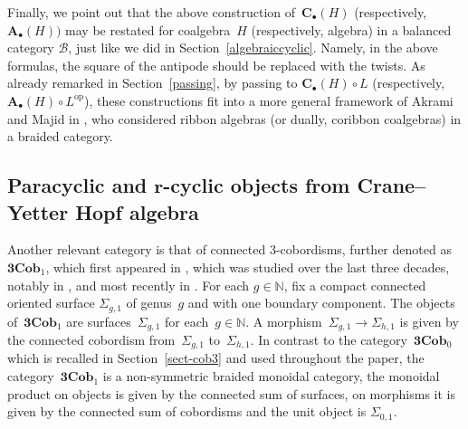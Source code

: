 \documentclass[10pt,a4paper]{amsart}
\numberwithin{equation}{section}
\newcommand{\mc}{\mathcal}
\newcommand{\opp}{\mathrm{op}}
\newcommand{\N}{\mathbb{N}}
\newcommand{\Cob}{\textbf{Cob}}
\newcommand{\conncob}{\textbf{3Cob}_1}
\begin{document}
Finally, we point out that the above construction of~$\textbf{C}_\bullet(H)$ (respectively,~$\textbf{A}_\bullet(H))$ may be restated for coalgebra~$H$ (respectively, algebra) in a balanced category $\mc B$, just like we did in Section~\ref{algebraiccyclic}. Namely, in the above formulas, the square of the antipode should be replaced with the twists. As already remarked in Section~\ref{passing}, by passing to $\textbf{C}_\bullet(H)\circ L$ (respectively,~$\textbf{A}_\bullet(H)\circ L^\opp$), these constructions fit into a more general framework of Akrami and Majid in \cite{cycliccocycles}, who considered ribbon algebras (or dually, coribbon coalgebras) in a braided category.



\subsection[Paracyclic and r-cyclic objects from Crane--Yetter Hopf algebra]{Paracyclic and $\boldsymbol{r}$-cyclic objects from Crane--Yetter Hopf algebra} \label{cy para}
Another relevant category is that of connected $3$-cobordisms, further denoted as $\conncob$, which first appeared in \cite{kerler}, which was studied over the last three decades, notably in \cite{asaeda, bobtcheva-piergallini, Ha, kerler2}, and most recently in \cite{beliakova-derenzi}.
For each $g\in \N$, fix a compact connected oriented surface $\Sigma_{g,1}$ of genus~$g$ and with one boundary component.
The objects of~$\conncob$ are surfaces~$\Sigma_{g,1}$ for each~$g\in \N$.
A morphism~$\Sigma_{g,1} \to \Sigma_{h,1}$ is given by the connected cobordism from~$\Sigma_{g,1}$ to~$\Sigma_{h,1}$.
In contrast to the category~$\textbf{3}\Cob_0$ which is recalled in Section~\ref{sect-cob3} and used throughout the paper, the category~$\conncob$ is a non-symmetric braided monoidal category, the monoidal product on objects is given by the connected sum of surfaces, on morphisms it is given by the connected sum of cobordisms and the unit object is $\Sigma_{0,1}$.
\end{document}
